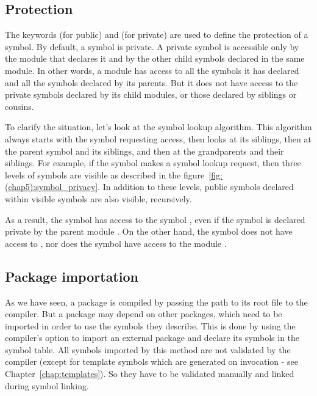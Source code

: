 \subsection{Protection}
\label{sec:symbol_protection}

The keywords  (for public) and  (for private) are used
to define the protection of a symbol. By default, a symbol is private. A private
symbol is accessible only by the module that declares it and by the other child
symbols declared in the same module. In other words, a module has access to all
the symbols it has declared and all the symbols declared by its parents. But it
does not have access to the private symbols declared by its child modules, or
those declared by siblings or cousins.

To clarify the situation, let's look at the symbol lookup algorithm. This
algorithm always starts with the symbol requesting access, then looks at its
siblings, then at the parent symbol and its siblings, and then at the
grandparents and their siblings. For example, if the symbol
 makes a symbol lookup request, then three levels
of symbols are visible as described in the figure~\ref{fig:(chap5):symbol_privacy}. In
addition to these levels, public symbols declared within visible symbols are
also visible, recursively.



As a result, the symbol  has access to the symbol
, even if the symbol  is declared
private by the parent module . On the other hand, the symbol
 does not have access to
, nor does the symbol  have access to
the module .

\subsection{Package importation}

As we have seen, a package is compiled by passing the path to its root file to
the compiler. But a package may depend on other packages, which need to be
imported in order to use the symbols they describe. This is done by using the
compiler's  option to import an external package and declare its
symbols in the symbol table. All symbols imported by this method are not
validated by the compiler (except for template symbols which are generated on
invocation - see Chapter~\ref{chap:templates}). So they have to be validated
manually and linked during symbol linking.

